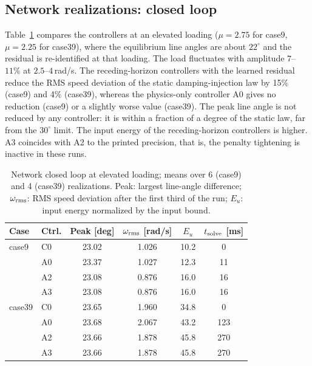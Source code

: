 \documentclass[preprint,12pt]{elsarticle}
\begin{document}
\subsection{Network realizations: closed loop}
Table~\ref{tab:net_cl} compares the controllers at an elevated loading ($\mu=2.75$ for case9, $\mu=2.25$ for case39), where the equilibrium line angles are about $22^\circ$ and the residual is re-identified at that loading. The load fluctuates with amplitude $7$--$11\%$ at $2.5$--$4$\,rad/s. The receding-horizon controllers with the learned residual reduce the RMS speed deviation of the static damping-injection law by 15\% (case9) and 4\% (case39), whereas the physics-only controller A0 gives no reduction (case9) or a slightly worse value (case39). The peak line angle is not reduced by any controller: it is within a fraction of a degree of the static law, far from the $30^\circ$ limit. The input energy of the receding-horizon controllers is higher. A3 coincides with A2 to the printed precision, that is, the penalty tightening is inactive in these runs.
\begin{table}[!t]\centering\small
\caption{Network closed loop at elevated loading; means over 6 (case9) and 4 (case39) realizations. Peak: largest line-angle difference; $\omega_{\rm rms}$: RMS speed deviation after the first third of the run; $E_u$: input energy normalized by the input bound.}
\label{tab:net_cl}
\begin{tabular}{llcccc}
\toprule
Case & Ctrl. & Peak [deg] & $\omega_{\rm rms}$ [rad/s] & $E_u$ & $t_{\rm solve}$ [ms]\\
\midrule
case9 & C0 & 23.02 & 1.026 & 10.2 & 0\\
 & A0 & 23.37 & 1.027 & 12.3 & 11\\
 & A2 & 23.08 & 0.876 & 16.0 & 16\\
 & A3 & 23.08 & 0.876 & 16.0 & 16\\
\midrule
case39 & C0 & 23.65 & 1.960 & 34.8 & 0\\
 & A0 & 23.68 & 2.067 & 43.2 & 123\\
 & A2 & 23.66 & 1.878 & 45.8 & 270\\
 & A3 & 23.66 & 1.878 & 45.8 & 270\\
\bottomrule
\end{tabular}
\end{table}
\end{document}
